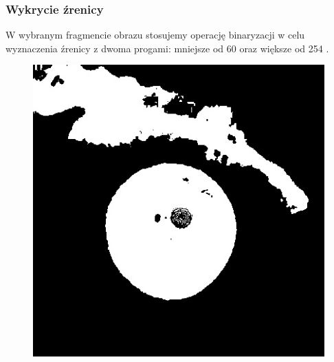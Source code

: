 \documentclass{beamer}
\begin{document}
\begin{frame}
\frametitle{Wykrycie źrenicy}
W wybranym fragmencie obrazu stosujemy operację binaryzacji w celu wyznaczenia źrenicy z dwoma progami: mniejsze od 60 oraz większe od 254 .
\begin{figure}
\begin{center}
\includegraphics[scale=0.25]{bin.jpg}
\end{center}
\end{figure}
\end{frame}

\end{document}
